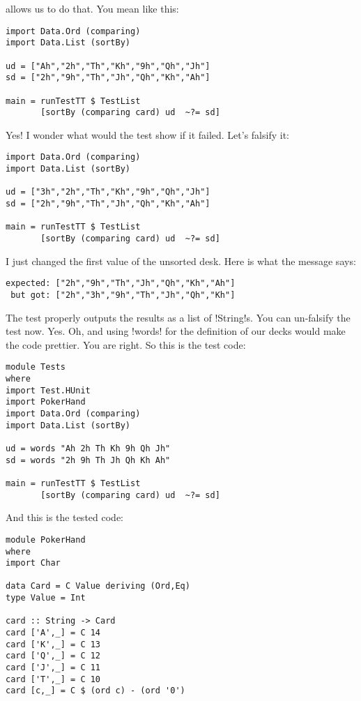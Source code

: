 allows us to do that.
\lhN You mean like this:
\begin{lstlisting}[frame=single]
import Data.Ord (comparing)
import Data.List (sortBy)

ud = ["Ah","2h","Th","Kh","9h","Qh","Jh"]
sd = ["2h","9h","Th","Jh","Qh","Kh","Ah"]

main = runTestTT $ TestList 
       [sortBy (comparing card) ud  ~?= sd]
\end{lstlisting} %
\hspace*{\fill}
\lhA \success Yes!
\lhN I wonder what would the test show if it failed. Let's falsify it:
\begin{lstlisting}[frame=single]
import Data.Ord (comparing)
import Data.List (sortBy)

ud = ["3h","2h","Th","Kh","9h","Qh","Jh"]
sd = ["2h","9h","Th","Jh","Qh","Kh","Ah"]

main = runTestTT $ TestList 
       [sortBy (comparing card) ud  ~?= sd]
\end{lstlisting} %
I just changed the first value of the unsorted desk. 
\lhA \failure Here is what the message says:
\begin{small}
\begin{verbatim}
expected: ["2h","9h","Th","Jh","Qh","Kh","Ah"]
 but got: ["2h","3h","9h","Th","Jh","Qh","Kh"]
\end{verbatim}
\end{small}
The test properly outputs the results as a list of \il!String!s. You can un-falsify the test now.
\lhN Yes.
\lhA Oh, and using \il!words! for the definition of our decks would make the code prettier.
\lhN You are right. So this is the test code:
\begin{lstlisting}[frame=single]
module Tests
where 
import Test.HUnit
import PokerHand
import Data.Ord (comparing)
import Data.List (sortBy)

ud = words "Ah 2h Th Kh 9h Qh Jh"
sd = words "2h 9h Th Jh Qh Kh Ah"

main = runTestTT $ TestList 
       [sortBy (comparing card) ud  ~?= sd]
\end{lstlisting} %
\hspace*{\fill}
\lhA \success And this is the tested code:
\begin{lstlisting}[frame=single]
module PokerHand
where
import Char

data Card = C Value deriving (Ord,Eq)
type Value = Int

card :: String -> Card
card ['A',_] = C 14
card ['K',_] = C 13
card ['Q',_] = C 12
card ['J',_] = C 11
card ['T',_] = C 10
card [c,_] = C $ (ord c) - (ord '0')
\end{lstlisting} %

\lhend
